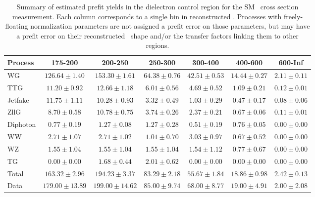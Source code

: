 \begin{table}[htbp]
  \begin{center}
    \caption{Summary of estimated prefit yields in the dielectron control region for the SM \zinvg\ cross section measurement.
    Each column corresponds to a single bin in reconstructed \ETgamma. Processes with freely-floating normalization parameters
    are not assigned a prefit error on those parameters, but may have a prefit error on their reconstructed \ETgamma\ shape
    and/or the transfer factors linking them to other regions.}
    \label{tab:BkgSummaryMonomu_prefit}
    \begin{tabular}{|l|c|c|c|c|c|c|}
      \hline
      Process & 175-200 & 200-250 & 250-300 & 300-400 & 400-600 & 600-Inf \\
      \hline
      WG & $126.64{\pm}1.40$ & $153.30{\pm}1.61$ & $64.38{\pm}0.76$ & $42.51{\pm}0.53$ & $14.44{\pm}0.27$ & $2.11{\pm}0.11$ \\
      TTG & $11.20{\pm}0.92$ & $12.66{\pm}1.18$ & $6.01{\pm}0.56$ & $4.69{\pm}0.52$ & $1.09{\pm}0.21$ & $0.12{\pm}0.01$ \\
      Jetfake & $11.75{\pm}1.11$ & $10.28{\pm}0.93$ & $3.32{\pm}0.49$ & $1.03{\pm}0.29$ & $0.47{\pm}0.17$ & $0.08{\pm}0.06$ \\
      ZllG & $8.70{\pm}0.58$ & $10.78{\pm}0.75$ & $3.74{\pm}0.26$ & $2.37{\pm}0.21$ & $0.67{\pm}0.06$ & $0.11{\pm}0.01$ \\
      Diphoton & $0.77{\pm}0.19$ & $1.27{\pm}0.08$ & $1.27{\pm}0.28$ & $0.51{\pm}0.19$ & $0.76{\pm}0.05$ & $0.00{\pm}0.00$ \\
      WW & $2.71{\pm}1.07$ & $2.71{\pm}1.02$ & $1.01{\pm}0.70$ & $3.03{\pm}0.97$ & $0.67{\pm}0.52$ & $0.00{\pm}0.00$ \\
      WZ & $1.55{\pm}1.04$ & $1.55{\pm}1.04$ & $1.55{\pm}1.04$ & $1.54{\pm}1.12$ & $0.77{\pm}0.67$ & $0.00{\pm}0.00$ \\
      TG & $0.00{\pm}0.00$ & $1.68{\pm}0.44$ & $2.01{\pm}0.62$ & $0.00{\pm}0.00$ & $0.00{\pm}0.00$ & $0.00{\pm}0.00$ \\
      \hline
      Total & $163.32{\pm}2.96$ & $194.23{\pm}3.37$ & $83.29{\pm}2.18$ & $55.67{\pm}1.84$ & $18.86{\pm}0.98$ & $2.42{\pm}0.13$ \\
      \hline
      Data & $179.00{\pm}13.89$ & $199.00{\pm}14.62$ & $85.00{\pm}9.74$ & $68.00{\pm}8.77$ & $19.00{\pm}4.91$ & $2.00{\pm}2.08$ \\
      \hline
    \end{tabular}
  \end{center}
\end{table}

